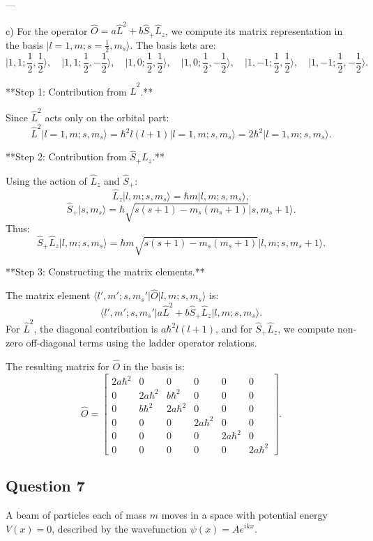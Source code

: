 \documentclass{article}
\begin{document}
---

c) For the operator $\hat{O} = a \hat{L}^2 + b \hat{S}_+ \hat{L}_z$, we compute its matrix representation in the basis $\lvert l = 1, m; s = \frac{1}{2}, m_s \rangle$. The basis kets are:
\[
\lvert 1, 1; \frac{1}{2}, \frac{1}{2} \rangle, \quad \lvert 1, 1; \frac{1}{2}, -\frac{1}{2} \rangle, \quad \lvert 1, 0; \frac{1}{2}, \frac{1}{2} \rangle, \quad \lvert 1, 0; \frac{1}{2}, -\frac{1}{2} \rangle, \quad \lvert 1, -1; \frac{1}{2}, \frac{1}{2} \rangle, \quad \lvert 1, -1; \frac{1}{2}, -\frac{1}{2} \rangle.
\]

**Step 1: Contribution from $\hat{L}^2$.**

Since $\hat{L}^2$ acts only on the orbital part:
\[
\hat{L}^2 \lvert l = 1, m; s, m_s \rangle = \hbar^2 l(l+1) \lvert l = 1, m; s, m_s \rangle = 2\hbar^2 \lvert l = 1, m; s, m_s \rangle.
\]

**Step 2: Contribution from $\hat{S}_+ \hat{L}_z$.**

Using the action of $\hat{L}_z$ and $\hat{S}_+$:
\[
\hat{L}_z \lvert l, m; s, m_s \rangle = \hbar m \lvert l, m; s, m_s \rangle,
\]
\[
\hat{S}_+ \lvert s, m_s \rangle = \hbar \sqrt{s(s+1) - m_s(m_s + 1)} \lvert s, m_s + 1 \rangle.
\]
Thus:
\[
\hat{S}_+ \hat{L}_z \lvert l, m; s, m_s \rangle = \hbar m \sqrt{s(s+1) - m_s(m_s + 1)} \lvert l, m; s, m_s + 1 \rangle.
\]

**Step 3: Constructing the matrix elements.**

The matrix element $\langle l', m'; s, m_s' \lvert \hat{O} \lvert l, m; s, m_s \rangle$ is:
\[
\langle l', m'; s, m_s' \lvert a \hat{L}^2 + b \hat{S}_+ \hat{L}_z \lvert l, m; s, m_s \rangle.
\]
For $\hat{L}^2$, the diagonal contribution is $a \hbar^2 l(l+1)$, and for $\hat{S}_+ \hat{L}_z$, we compute non-zero off-diagonal terms using the ladder operator relations.

The resulting matrix for $\hat{O}$ in the basis is:
\[
\hat{O} = 
\begin{bmatrix}
2a\hbar^2 & 0 & 0 & 0 & 0 & 0 \\
0 & 2a\hbar^2 & b\hbar^2 & 0 & 0 & 0 \\
0 & b\hbar^2 & 2a\hbar^2 & 0 & 0 & 0 \\
0 & 0 & 0 & 2a\hbar^2 & 0 & 0 \\
0 & 0 & 0 & 0 & 2a\hbar^2 & 0 \\
0 & 0 & 0 & 0 & 0 & 2a\hbar^2
\end{bmatrix}.
\]


\subsection{Question 7}
A beam of particles each of mass $m$ moves in a space with potential energy $V(x) = 0$, described by the wavefunction $\psi(x) = A e^{ikx}$.  
\end{document}

